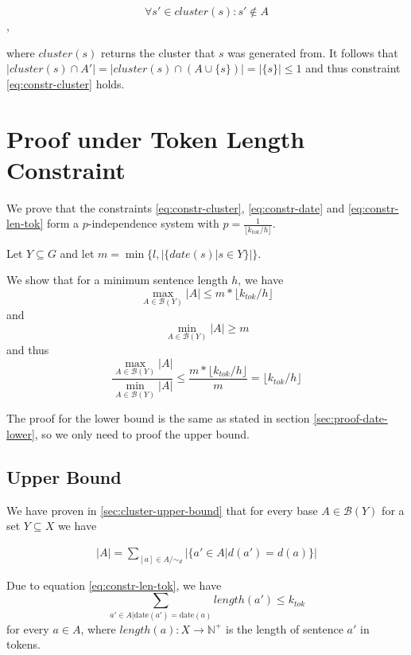 \documentclass[a4paper,BCOR=10mm]{report}
\numberwithin{lemma}{chapter}
\numberwithin{definition}{chapter}
\begin{document}
\begin{appendices}
\begin{equation}
\forall s' \in \mathit{cluster}(s) : s' \not\in A
\end{equation},

where $\mathit{cluster}(s)$ returns the cluster that $s$ was generated from.
It follows that $|\mathit{cluster}(s) \cap A'| = |\mathit{cluster}(s) \cap (A \cup \{ s \})| = |\{s\}| \leq 1$ and thus constraint \ref{eq:constr-cluster} holds.


\section{Proof under Token Length Constraint}

We prove that the constraints \ref{eq:constr-cluster}, \ref{eq:constr-date} and \ref{eq:constr-len-tok} form a $p$-independence system with $p = \frac{1}{\lfloor k_{tok} / h \rfloor}$.

Let $Y \subseteq G$ and let $m = \min \{ l, |\{\mathit{date}(s) | s \in Y\}| \}$.

We show that for a minimum sentence length $h$, we have 
\begin{equation}
\max_{A \in \mathcal{B}(Y)} |A| \leq m * \lfloor k_{tok} / h \rfloor
\end{equation}
and
\begin{equation}
    \min_{A \in \mathcal{B}(Y)} |A| \geq m
\end{equation}
and thus
\begin{equation}
\frac{\max_{A \in \mathcal{B}(Y)} |A|}{\min_{A \in \mathcal{B}(Y)} |A|}
\leq \frac{m * \lfloor k_{tok} / h \rfloor}{m} = \lfloor k_{tok} / h \rfloor
\end{equation}

The proof for the lower bound is the same as stated in section \ref{sec:proof-date-lower}, so we only need to proof the upper bound.

\subsection{Upper Bound}

We have proven in \ref{sec:cluster-upper-bound} that for every base $A \in \mathcal{B}(Y)$ for a set $Y \subseteq X$ we have

\begin{align}
|A| = \sum_{[a] \in A/\sim_d} |\{ a' \in A | d(a') = d(a) \}|
\end{align}

Due to equation \ref{eq:constr-len-tok}, we have
\begin{equation}
\sum_{ a' \in A | \text{date}(a') = \text{date}(a)} \mathit{length}(a') \leq k_{tok}
\end{equation}
for every $a \in A$, where $\mathit{length}(a) : X \rightarrow \mathbb{N}^+$ is the length of sentence $a'$ in tokens.


\end{appendices}
\end{document}
